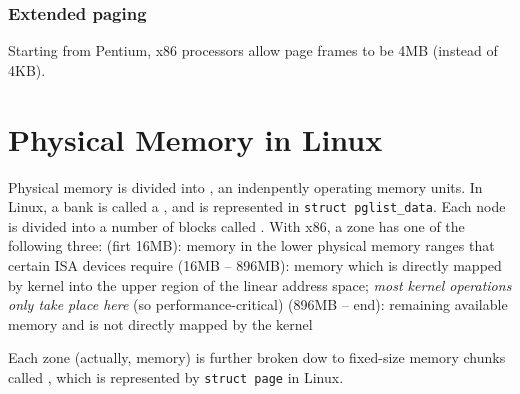 \subsection{Extended paging}
Starting from Pentium, x86 processors allow page frames to be 4MB (instead of 4KB).


\chapter{Physical Memory in Linux}
Physical memory is divided into , an indenpently operating memory
units. In Linux, a bank is called a , and is represented in 
{\tt struct pglist\_data}. Each node is divided into a number of blocks called
. With x86, a zone has one of the following three:
\bit
\w {} (firt 16MB):   memory in the lower physical memory ranges
that certain ISA devices require
\w {} (16MB -- 896MB): memory which is directly mapped by kernel
into the upper region of the linear address space; {\em most kernel operations
  only take place here} (so performance-critical)
\w {} (896MB -- end): remaining available memory and is not
directly mapped by the kernel
\eit

Each zone (actually, memory) is further broken dow to fixed-size memory chunks
called , which is represented by {\tt struct page} in Linux. 
